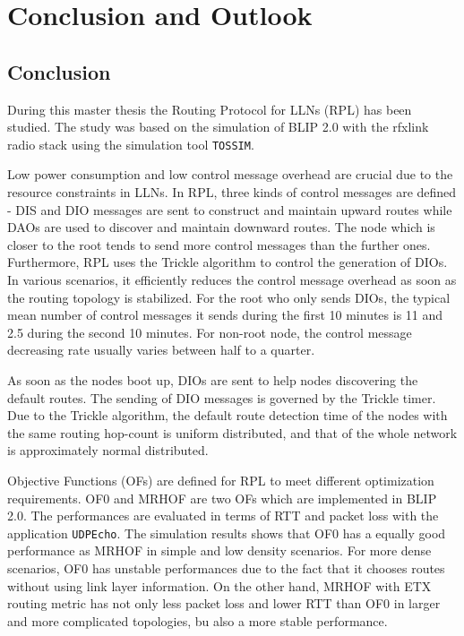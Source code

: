 \chapter{Conclusion and Outlook}
\label{Con}
\section{Conclusion} 
\label{Con:Con}

During this master thesis the Routing Protocol for LLNs (RPL) has been studied. The study was based on the simulation of BLIP 2.0 with the rfxlink radio stack using the simulation tool \texttt{TOSSIM}. 

Low power consumption and low control message overhead are crucial due to the resource constraints in LLNs. In RPL, three kinds of control messages are defined - DIS and DIO messages are sent to construct and maintain upward routes while DAOs are used to discover and maintain downward routes. The node which is closer to the root tends to send more control messages than the further ones. Furthermore, RPL uses the Trickle algorithm to control the generation of DIOs. In various scenarios, it efficiently reduces the control message overhead as soon as the routing topology is stabilized. For the root who only sends DIOs, the typical mean number of control messages it sends during the first 10 minutes is 11 and 2.5 during the second 10 minutes. For non-root node, the control message decreasing rate usually varies between half to a quarter.

As soon as the nodes boot up, DIOs are sent to help nodes discovering the default routes. The sending of DIO messages is governed by the Trickle timer. Due to the Trickle algorithm, the default route detection time of the nodes with the same routing hop-count is uniform distributed, and that of the whole network is approximately normal distributed. 
 
Objective Functions (OFs) are defined for RPL to meet different optimization requirements. OF0 and MRHOF are two OFs which are implemented in BLIP 2.0. The performances are evaluated in terms of RTT and packet loss with the application \texttt{UDPEcho}\@. The simulation results shows that OF0 has a equally good performance as MRHOF in simple and low density scenarios. For more dense scenarios, OF0 has unstable performances due to the fact that it chooses routes without using link layer information. On the other hand, MRHOF with ETX routing metric has not only less packet loss and lower RTT than OF0 in larger and more complicated topologies, bu also a more stable performance. 

